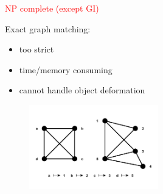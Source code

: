 \documentclass[handout]{beamer}
\begin{document}
\begin{frame}[allowframebreaks]
\vspace{10pt}
\textcolor{red}{NP complete (except GI)~{\tiny\citep{Garey_NPComplet}}}

\framebreak
Exact graph matching:
\begin{itemize}
\item too strict
\item time/memory consuming
\item cannot handle object deformation
\end{itemize}
\begin{figure}[htb]
	\centering
	\includegraphics[width=0.5\textwidth]{fig/inexactGM}
\end{figure}
\end{frame}

\end{document}
